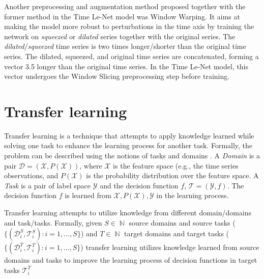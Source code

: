\documentclass[a4paper,11pt,twoside]{report}
\theoremstyle{definition}
\DeclareMathOperator{\natur}{\mathbb{N}}
\begin{document}
Another preprocessing and augmentation method proposed together with the former method in the Time Le-Net model was Window Warping. It aims at making the model more robust to perturbations in the time axis by training the network on \textit{squeezed} or \textit{dilated} series together with the original series. The \textit{dilated}/\textit{squeezed} time series is two times longer/shorter than the original time series.
The dilated, squeezed, and original time series are concatenated, forming a vector 3.5 longer than the original time series. In the Time Le-Net model, this vector undergoes the Window Slicing preprocessing step before training.



\section{Transfer learning}
Transfer learning is a technique that attempts to apply knowledge learned  while solving one task to enhance the learning process for another task. Formally, the problem can be described using the notions of tasks and domains \cite{survey_transfer_learning, comp_survey_transfer_leaerning}. A \textit{Domain} is a pair $\mathcal{D}=(\mathcal{X}, P(\mathcal{X}))$, where $\mathcal{X}$ is the feature space (e.g., the time series observations, and $P(\mathcal{X})$ is the probability distribution over the feature space. A \textit{Task} is a pair of label space $\mathcal{Y}$ and the decision function $f$, $\mathcal{T} = (\mathcal{Y}, f)$. The decision function $f$ is learned from $\mathcal{X}, P(\mathcal{X}), \mathcal{Y}$ in the learning process.

Transfer learning attempts to utilize knowledge from different domain/domains and task/tasks. Formally, given $S \in \natur$ source domains and source tasks ($\{(\mathcal{D}_i^S,\mathcal{T}_i^S): i=1, \dots, S \}$) and $T \in \natur$ target domains and target tasks ($\{(\mathcal{D}_i^T,\mathcal{T}_i^T): i=1, \dots, S \}$) transfer learning utilizes knowledge learned from source domains and tasks to improve the learning process of decision functions in target tasks $\mathcal{T}_i^T$
\end{document}

